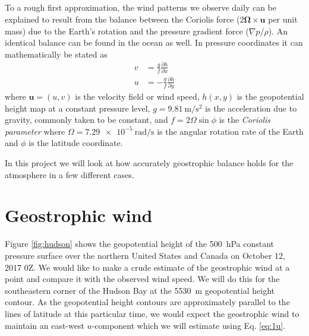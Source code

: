\documentclass[11pt]{article}
\title{\spacedlowsmallcaps{\small 12.818: Introduction to Atmospheric Data and Large-scale Dynamics}\\ \spacedlowsmallcaps{\Large Project five: Geostrophic and ageostrophic flow}}
\author{\spacedlowsmallcaps{Ali Ramadhan}}
\date{}
\begin{document}
\maketitle

To a rough first approximation, the wind patterns we observe daily can be explained to result from the balance between the Coriolis force ($2\bm{\Omega \times u}$ per unit mass) due to the Earth's rotation and the pressure gradient force ($\nabla p / \rho$). An identical balance can be found in the ocean as well. In pressure coordinates it can mathematically be stated as
\begin{subequations}
\begin{align}
	v &= \frac{g}{f} \frac{\partial h}{\partial x} \label{eq:1v} \\
	u &= -\frac{g}{f} \frac{\partial h}{\partial y} \label{eq:1u}
\end{align}
\end{subequations}
where $\bm{u} = (u,v)$ is the velocity field or wind speed, $h(x,y)$ is the geopotential height map at a constant pressure level, $g = \SI{9.81}{\m/\s^2}$ is the acceleration due to gravity, commonly taken to be constant, and $f=2\Omega \sin\phi$ is the \emph{Coriolis parameter} where $\Omega = \SI{7.29e-5}{\radian/\s}$ is the angular rotation rate of the Earth and $\phi$ is the latitude coordinate.

In this project we will look at how accurately geostrophic balance holds for the atmosphere in a few different cases.

\section{Geostrophic wind}
Figure \ref{fig:hudson} shows the geopotential height of the \SI{500}{\hecto\Pa} constant pressure surface over the northern United States and Canada on October 12, 2017 0Z. We would like to make a crude estimate of the geostrophic wind at a point and compare it with the observed wind speed. We will do this for the southeastern corner of the Hudson Bay at the \SI{5530}{\m} geopotential height contour. As the geopotential height contours are approximately parallel to the lines of latitude at this particular time, we would expect the geostrophic wind to maintain an east-west $u$-component which we will estimate using Eq. \eqref{eq:1u}.
\end{document}
